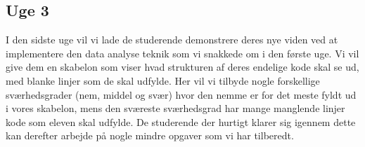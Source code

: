 \documentclass[11pt]{article}
\begin{document}
    \subsection*{Uge 3}
        I den sidste uge vil vi lade de studerende demonstrere deres nye viden
        ved at implementere den data analyse teknik som vi snakkede om i den
        første uge. Vi vil give dem en skabelon som viser hvad strukturen af
        deres endelige kode skal se ud, med blanke linjer som de skal udfylde.
        Her vil vi tilbyde nogle forskellige sværhedsgrader (nem, middel og svær)
        hvor den nemme er for det meste fyldt ud i vores skabelon, mens den
        sværeste sværhedsgrad har mange manglende linjer kode som eleven skal
        udfylde. De studerende der hurtigt klarer sig igennem dette kan derefter
        arbejde på nogle mindre opgaver som vi har tilberedt.
\end{document}
